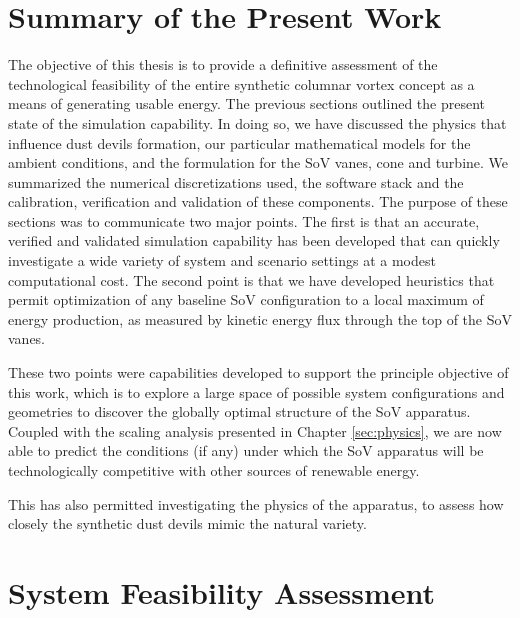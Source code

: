 \label{sec:conclusions}

%
%

%
%

\section{Summary of the Present Work}

The objective of this thesis is to provide a definitive assessment of
the technological feasibility of the entire synthetic columnar vortex
concept as a means of generating usable energy. The previous sections
outlined the present state of the simulation capability. In doing so, we
have discussed the physics that influence dust devils formation, our
particular mathematical models for the ambient conditions, and the
formulation for the SoV vanes, cone and turbine. We summarized the
numerical discretizations used, the software stack and the calibration,
verification and validation of these components. The purpose of these
sections was to communicate two major points. The first is that an
accurate, verified and validated simulation capability has been
developed that can quickly investigate a wide variety of system and
scenario settings at a modest computational cost. The second point is
that we have developed heuristics that permit optimization of any
baseline SoV configuration to a local maximum of energy production, as
measured by kinetic energy flux through the top of the SoV vanes.  

These two points were capabilities developed to support the principle
objective of this work, which is to explore a large space of possible
system configurations and geometries to discover the globally optimal
structure of the SoV apparatus. Coupled with the scaling analysis
presented in Chapter \ref{sec:physics}, we are now able to predict
the conditions (if any) under which the SoV apparatus will be
technologically competitive with other sources of renewable energy.  

This has also permitted investigating the physics of the apparatus, to
assess how closely the synthetic dust devils mimic the natural
variety. 

%
%
\section{System Feasibility Assessment}


